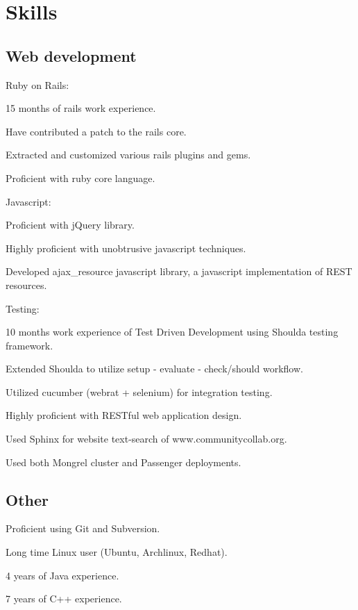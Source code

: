 \documentclass{resume}
\begin{document}
\section{Skills}

\subsection{Web development}

\begin{compactitem}
  \item Ruby on Rails:
    \begin{compactitem}
      \item 15 months of rails work experience.
      \item Have contributed a patch to the rails core.
      \item Extracted and customized various rails plugins and gems.
      \item Proficient with ruby core language.
    \end{compactitem}

  \item Javascript:
    \begin{compactitem}
      \item Proficient with jQuery library.
      \item Highly proficient with unobtrusive javascript techniques.
      \item Developed ajax\_resource javascript library, a javascript implementation of REST resources.
    \end{compactitem}

  \item Testing:
    \begin{compactitem}
      \item 10 months work experience of Test Driven Development using Shoulda testing framework.
      \item Extended Shoulda to utilize setup - evaluate - check/should workflow.
      \item Utilized cucumber (webrat + selenium) for integration testing.
    \end{compactitem}

  \item Highly proficient with RESTful web application design.
  \item Used Sphinx for website text-search of www.communitycollab.org.
  \item Used both Mongrel cluster and Passenger deployments.
\end{compactitem}

\subsection{Other}
\begin{compactitem}
  \item Proficient using Git and Subversion.
  \item Long time Linux user (Ubuntu, Archlinux, Redhat).
  \item 4 years of Java experience.
  \item 7 years of C++ experience.
\end{compactitem}
\end{document}
